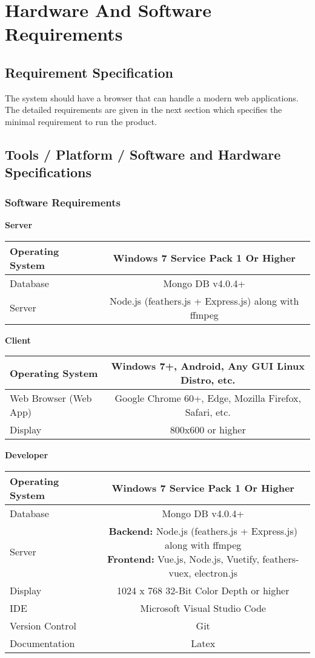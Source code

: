 \section{Hardware And Software Requirements}

		\vs
		\subsection{Requirement Specification}
		\vs
		The system should have a browser that can handle a modern web applications. The detailed
		requirements are given in the next section which specifies the minimal requirement to run
		the product.
		\vs
		\subsection{Tools / Platform / Software and Hardware Specifications}
		\subsubsection{Software Requirements}
		\begin{center}
			\textbf{\large Server}
			\vs
			\bgroup
			\def\arraystretch{2}%
			\begin{tabular}{|m{5cm}|c|}
				\hline
				Operating System & Windows 7 Service Pack 1 Or Higher \\
				\hline
				Database & Mongo DB v4.0.4+ \\
				\hline
				Server & Node.js (feathers.js + Express.js) along with ffmpeg \\
				\hline					
			\end{tabular}
			\vs[1]
			\textbf{\large Client}
			\vs
			\begin{tabular}{|m{5cm}|c|}
				\hline
				Operating System & Windows 7+, Android, Any GUI Linux Distro, etc. \\
				\hline
				Web Browser (Web App) & Google Chrome 60+, Edge, Mozilla Firefox, Safari, etc.
				\\
				\hline
				Display & 800x600 or higher
				 \\
				\hline					
			\end{tabular}
			\vs[1]
			\textbf{\large Developer}
			\vs
			\begin{tabular}{|m{5cm}|c|}
				\hline
				Operating System & Windows 7 Service Pack 1 Or Higher				 \\
				\hline
				Database & Mongo DB v4.0.4+				\\
				\hline
				Server  &  \makecell{\textbf{Backend: } Node.js (feathers.js + Express.js) along with ffmpeg \\ \textbf{Frontend: } Vue.js, Node.js, Vuetify, feathers-vuex, electron.js} \\
				\hline			
				Display  &1024 x 768 32-Bit Color Depth or higher			\\						
				\hline
				IDE  & Microsoft Visual Studio Code 			\\						
				\hline
				Version Control  & Git 			\\						
				\hline
					Documentation  & Latex 			\\						
					\hline
			\end{tabular}
			\egroup
		\end{center}
		\vs

